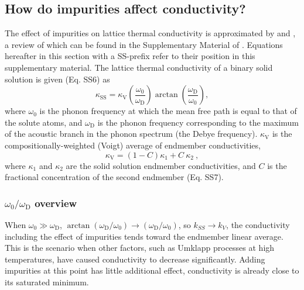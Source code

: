 \subsection{How do impurities affect conductivity?} 
\label{impur_theory}

The effect of impurities on lattice thermal conductivity is approximated by \citet{Klemens1960} and \citet{Padture1997}, a review of which can be found in the Supplementary Material of \citet{Stackhouse2015}. Equations hereafter in this section with a SS-prefix refer to their position in this supplementary material. The lattice thermal conductivity of a binary solid solution is given (Eq. SS6) as
%
\begin{equation}
\kappa_{\mathrm{SS}}=\kappa_{\mathrm{V}}\left ( \frac{\omega_{\mathrm{0}}}{\omega_{\mathrm{D}}} \right )\arctan \left ( \frac{\omega_{\mathrm{D}}}{\omega_{\mathrm{0}}} \right ),
\label{eq.SS2015SM.6}
\end{equation}
%
where $\omega_{\mathrm{0}}$ is the phonon frequency at which the mean free path is equal to that of the solute atoms, and $\omega_{\mathrm{D}}$ is the phonon frequency corresponding to the maximum of the acoustic branch in the phonon spectrum (the Debye frequency). $\kappa_{\mathrm{V}}$ is the compositionally-weighted (Voigt) average of endmember conductivities, 
%
\begin{equation}
\kappa_{\mathrm{V}}=\left ( 1-C \right )\kappa_{1} + C\ \kappa_{2} \ ,
\label{eq.SS2015SM.7}
\end{equation}
%
where $\kappa_{\mathrm{1}}$ and $\kappa_{\mathrm{2}}$ are the solid solution endmember conductivities, and $C$ is the fractional concentration of the second endmember (Eq. SS7).

\subsubsection{$\omega_{\mathrm{0}}/\omega_{\mathrm{D}}$ overview} 

When $\omega_{\mathrm{0}} \gg \omega_{\mathrm{D}}$, $\arctan(\omega_{\mathrm{D}}/\omega_{\mathrm{0}}) \rightarrow (\omega_{\mathrm{D}}/\omega_{\mathrm{0}})$, so $k_{SS} \rightarrow k_{V}$, the conductivity including the effect of impurities tends toward the endmember linear average. This is the scenario when other factors, such as Umklapp processes at high temperatures, have caused conductivity to decrease significantly. Adding impurities at this point has little additional effect, conductivity is already close to its saturated minimum.

